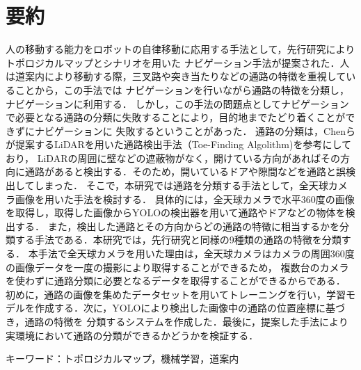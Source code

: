 \documentclass[../main]{subfiles}
\begin{document}
 \chapter*{要約}
    人の移動する能力をロボットの自律移動に応用する手法として，先行研究によりトポロジカルマップとシナリオを用いた
    ナビゲーション手法が提案された．人は道案内により移動する際，三叉路や突き当たりなどの通路の特徴を重視していることから，この手法では
    ナビゲーションを行いながら通路の特徴を分類し，ナビゲーションに利用する．
    しかし，この手法の問題点としてナビゲーションで必要となる通路の分類に失敗することにより，目的地までたどり着くことができずにナビゲーションに
    失敗するということがあった．
    通路の分類は，Chenらが提案するLiDARを用いた通路検出手法（Toe-Finding Algolithm)を参考にしており，
    LiDARの周囲に壁などの遮蔽物がなく，開けている方向があればその方向に通路があると検出する．そのため，開いているドアや隙間などを通路と誤検出してしまった．
    そこで，本研究では通路を分類する手法として，全天球カメラ画像を用いた手法を検討する．
    具体的には，全天球カメラで水平360度の画像を取得し，取得した画像からYOLOの検出器を用いて通路やドアなどの物体を検出する．
    また，検出した通路とその方向からどの通路の特徴に相当するかを分類する手法である．本研究では，先行研究と同様の9種類の通路の特徴を分類する．
    本手法で全天球カメラを用いた理由は，全天球カメラはカメラの周囲360度の画像データを一度の撮影により取得することができるため，
    複数台のカメラを使わずに通路分類に必要となるデータを取得することができるからである．
    初めに，通路の画像を集めたデータセットを用いてトレーニングを行い，学習モデルを作成する．次に，YOLOにより検出した画像中の通路の位置座標に基づき，通路の特徴を
    分類するシステムを作成した．最後に，提案した手法により実環境において通路の分類ができるかどうかを検証する．\\
    \vspace{0.5cm}

    キーワード：トポロジカルマップ，機械学習，道案内
\end{document}
